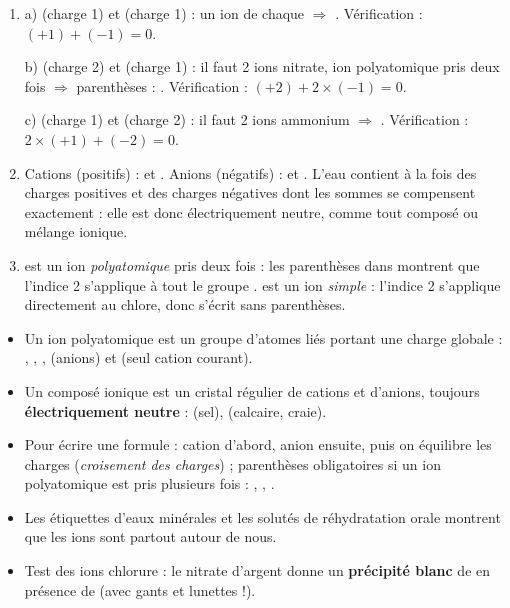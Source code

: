 \documentclass[11pt]{article}
\newcommand{\cle}[1]{{\popxbold\color{popdark}#1}}
\begin{document}
\begin{corrige}
\begin{enumerate}
\item a)  (charge 1) et  (charge 1) : un ion de chaque $\Rightarrow$ . Vérification : $(+1)+(-1)=0$.

b)  (charge 2) et  (charge 1) : il faut 2 ions nitrate, ion polyatomique pris deux fois $\Rightarrow$ parenthèses : . Vérification : $(+2)+2\times(-1)=0$.

c)  (charge 1) et  (charge 2) : il faut 2 ions ammonium $\Rightarrow$ . Vérification : $2\times(+1)+(-2)=0$.
\item Cations (positifs) :  et . Anions (négatifs) :  et . L'eau contient à la fois des charges positives et des charges négatives dont les sommes se compensent exactement : elle est donc électriquement neutre, comme tout composé ou mélange ionique.
\item {} est un ion \emph{polyatomique} pris deux fois : les parenthèses dans  montrent que l'indice 2 s'applique à tout le groupe .  est un ion \emph{simple} : l'indice 2 s'applique directement au chlore, donc  s'écrit sans parenthèses.
\end{enumerate}
\end{corrige}

\begin{aretenir}
\begin{itemize}
\item Un \cle{ion polyatomique} est un groupe d'atomes liés portant une charge globale : , , ,  (anions) et  (seul cation courant).
\item Un \cle{composé ionique} est un cristal régulier de cations et d'anions, toujours \textbf{électriquement neutre} :  (sel),  (calcaire, craie).
\item Pour écrire une formule : cation d'abord, anion ensuite, puis on équilibre les charges (\emph{croisement des charges}) ; parenthèses obligatoires si un ion polyatomique est pris plusieurs fois : , , .
\item Les étiquettes d'eaux minérales et les solutés de réhydratation orale montrent que les ions sont partout autour de nous.
\item Test des ions chlorure : le nitrate d'argent donne un \textbf{précipité blanc} de  en présence de  (avec gants et lunettes !).
\end{itemize}
\end{aretenir}
\end{document}
